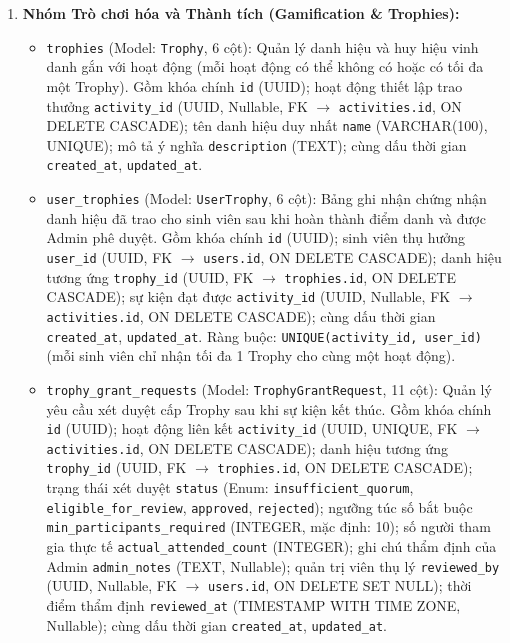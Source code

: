 \begin{enumerate}
    \item \textbf{Nhóm Trò chơi hóa và Thành tích (Gamification \& Trophies):}
    \begin{itemize}
        \item \texttt{trophies} (Model: \texttt{Trophy}, 6 cột): Quản lý danh hiệu và huy hiệu vinh danh gắn với hoạt động (mỗi hoạt động có thể không có hoặc có tối đa một Trophy). Gồm khóa chính \texttt{id} (UUID); hoạt động thiết lập trao thưởng \texttt{activity\_id} (UUID, Nullable, FK $\rightarrow$ \texttt{activities.id}, ON DELETE CASCADE); tên danh hiệu duy nhất \texttt{name} (VARCHAR(100), UNIQUE); mô tả ý nghĩa \texttt{description} (TEXT); cùng dấu thời gian \texttt{created\_at}, \texttt{updated\_at}.
        \item \texttt{user\_trophies} (Model: \texttt{UserTrophy}, 6 cột): Bảng ghi nhận chứng nhận danh hiệu đã trao cho sinh viên sau khi hoàn thành điểm danh và được Admin phê duyệt. Gồm khóa chính \texttt{id} (UUID); sinh viên thụ hưởng \texttt{user\_id} (UUID, FK $\rightarrow$ \texttt{users.id}, ON DELETE CASCADE); danh hiệu tương ứng \texttt{trophy\_id} (UUID, FK $\rightarrow$ \texttt{trophies.id}, ON DELETE CASCADE); sự kiện đạt được \texttt{activity\_id} (UUID, Nullable, FK $\rightarrow$ \texttt{activities.id}, ON DELETE CASCADE); cùng dấu thời gian \texttt{created\_at}, \texttt{updated\_at}. Ràng buộc: \texttt{UNIQUE(activity\_id, user\_id)} (mỗi sinh viên chỉ nhận tối đa 1 Trophy cho cùng một hoạt động).
        \item \texttt{trophy\_grant\_requests} (Model: \texttt{TrophyGrantRequest}, 11 cột): Quản lý yêu cầu xét duyệt cấp Trophy sau khi sự kiện kết thúc. Gồm khóa chính \texttt{id} (UUID); hoạt động liên kết \texttt{activity\_id} (UUID, UNIQUE, FK $\rightarrow$ \texttt{activities.id}, ON DELETE CASCADE); danh hiệu tương ứng \texttt{trophy\_id} (UUID, FK $\rightarrow$ \texttt{trophies.id}, ON DELETE CASCADE); trạng thái xét duyệt \texttt{status} (Enum: \texttt{insufficient\_quorum}, \texttt{eligible\_for\_review}, \texttt{approved}, \texttt{rejected}); ngưỡng túc số bắt buộc \texttt{min\_participants\_required} (INTEGER, mặc định: 10); số người tham gia thực tế \texttt{actual\_attended\_count} (INTEGER); ghi chú thẩm định của Admin \texttt{admin\_notes} (TEXT, Nullable); quản trị viên thụ lý \texttt{reviewed\_by} (UUID, Nullable, FK $\rightarrow$ \texttt{users.id}, ON DELETE SET NULL); thời điểm thẩm định \texttt{reviewed\_at} (TIMESTAMP WITH TIME ZONE, Nullable); cùng dấu thời gian \texttt{created\_at}, \texttt{updated\_at}.
    \end{itemize}


\end{enumerate}
